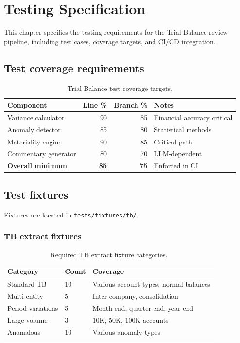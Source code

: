 \documentclass[11pt,a4paper,twoside]{report}
\begin{document}
\chapter{Testing Specification}\label{ch:testing}

This chapter specifies the testing requirements for the Trial Balance review
pipeline, including test cases, coverage targets, and CI/CD integration.

\section{Test coverage requirements}

\begin{table}[htbp]
\centering
\caption{Trial Balance test coverage targets.}
\label{tab:tb-coverage}
\footnotesize
\begin{tabularx}{\linewidth}{@{}l r r X@{}}
\toprule
\textbf{Component} & \textbf{Line \%} & \textbf{Branch \%} & \textbf{Notes} \\ \midrule
Variance calculator & 90 & 85 & Financial accuracy critical \\
Anomaly detector & 85 & 80 & Statistical methods \\
Materiality engine & 90 & 85 & Critical path \\
Commentary generator & 80 & 70 & LLM-dependent \\
\textbf{Overall minimum} & \textbf{85} & \textbf{75} & Enforced in CI \\
\bottomrule
\end{tabularx}
\end{table}

\section{Test fixtures}

Fixtures are located in \texttt{tests/fixtures/tb/}.

\subsection{TB extract fixtures}

\begin{table}[htbp]
\centering
\caption{Required TB extract fixture categories.}
\footnotesize
\begin{tabularx}{\linewidth}{@{}l l X@{}}
\toprule
\textbf{Category} & \textbf{Count} & \textbf{Coverage} \\ \midrule
Standard TB & 10 & Various account types, normal balances \\
Multi-entity & 5 & Inter-company, consolidation \\
Period variations & 5 & Month-end, quarter-end, year-end \\
Large volume & 3 & 10K, 50K, 100K accounts \\
Anomalous & 10 & Various anomaly types \\
\bottomrule
\end{tabularx}
\end{table}
\end{document}

